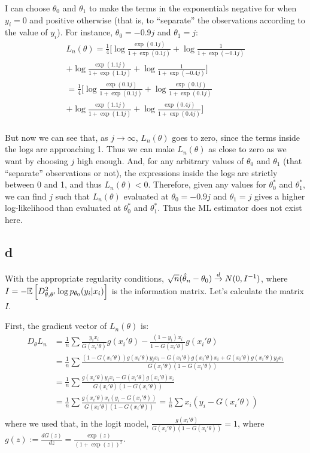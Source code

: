 \documentclass[12pt]{paper}
\begin{document}
I can choose $\theta_0$ and $\theta_1$ to make the terms in the exponentials negative for when $y_i=0$ and positive otherwise (that is, to ``separate'' the observations according to the value of $y_i$). For instance, $\theta_0=-0.9j$ and $\theta_1=j$:
\begin{align*}
L_n(\theta)=\frac{1}{4}\Big[\log{\frac{\exp(0.1j)}{1+\exp(0.1j)}}+\log{\frac{1}{1+\exp(-0.1j)}}\\
+\log{\frac{\exp(1.1j)}{1+\exp(1.1j)}}+\log{\frac{1}{1+\exp(-0.4j)}}\Big]\\
=\frac{1}{4}\Big[\log{\frac{\exp(0.1j)}{1+\exp(0.1j)}}+\log{\frac{\exp(0.1j)}{1+\exp(0.1j)}}\\
+\log{\frac{\exp(1.1j)}{1+\exp(1.1j)}}+\log{\frac{\exp(0.4j)}{1+\exp(0.4j)}}\Big]\\
\end{align*}

But now we can see that, as $j\to\infty$, $L_n(\theta)$ goes to zero, since the terms inside the logs are approaching 1. Thus we can make $L_n(\theta)$ as close to zero as we want by choosing $j$ high enough. And, for any arbitrary values of $\theta_0$ and $\theta_1$ (that ``separate'' observations or not), the expressions inside the logs are strictly between 0 and 1, and thus $L_n(\theta)<0$. Therefore, given any values for $\theta^{*}_0$ and $\theta^{*}_1$, we can find $j$ such that $L_n(\theta)$ evaluated at $\theta_0=-0.9j$ and $\theta_1=j$ gives a higher log-likelihood than evaluated at $\theta^{*}_0$ and $\theta^{*}_1$. Thus the ML estimator does not exist here.

\subsection*{d}

With the appropriate regularity conditions, $\sqrt{n}(\hat{\theta}_n-\theta_0)\overset{d}{\to} N(0,I^{-1})$, where $I=-\mathbb{E} \left [ D^2_{\theta,\theta'}\log{p_{\theta_0}(y_i|x_i)} \right ]$ is the information matrix. Let's calculate the matrix $I$.

First, the gradient vector of $L_n(\theta)$ is:
\begin{align*}
D_\theta L_n&=\frac{1}{n}\sum{\frac{y_ix_i}{G(x_i'\theta)}g(x_i'\theta)-\frac{(1-y_i)x_i}{1-G(x_i'\theta)}g(x_i'\theta)}\\
&=\frac{1}{n}\sum{\frac{(1-G(x_i'\theta))g(x_i'\theta)y_ix_i-G(x_i'\theta)g(x_i'\theta)x_i+G(x_i'\theta)g(x_i'\theta)y_ix_i}{G(x_i'\theta)(1-G(x_i'\theta))}}\\
&=\frac{1}{n}\sum{\frac{g(x_i'\theta)y_ix_i-G(x_i'\theta)g(x_i'\theta)x_i}{G(x_i'\theta)(1-G(x_i'\theta))}}\\
&=\frac{1}{n}\sum{\frac{g(x_i'\theta)x_i(y_i-G(x_i'\theta))}{G(x_i'\theta)(1-G(x_i'\theta))}}=\frac{1}{n}\sum{x_i(y_i-G(x_i'\theta))}\\
\end{align*}
\noindent where we used that, in the logit model, $\frac{g(x_i'\theta)}{G(x_i'\theta)(1-G(x_i'\theta))}=1$, where $g(z):=\frac{dG(z)}{dz}=\frac{\exp(z)}{(1+\exp(z))^2}$.
\end{document}
